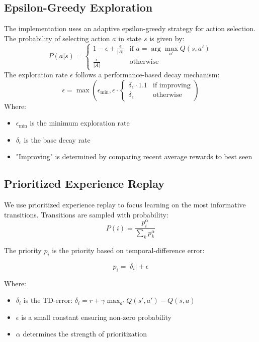 \documentclass[10pt]{article}
\theoremstyle{definition}
\begin{document}
\subsection{Epsilon-Greedy Exploration}
The implementation uses an adaptive epsilon-greedy strategy for action selection. \cite{tokic2011adaptive}
The probability of selecting action $a$ in state $s$ is given by:
\begin{equation}
    P(a|s) = \begin{cases}
    1-\epsilon + \frac{\epsilon}{|A|} & \text{if } a = \arg\max_{a'} Q(s,a') \\
    \frac{\epsilon}{|A|} & \text{otherwise}
    \end{cases}
\end{equation}
The exploration rate $\epsilon$ follows a performance-based decay mechanism:
\begin{equation}
    \epsilon = \max(\epsilon_{\min}, \epsilon \cdot \begin{cases}
    \delta_\epsilon \cdot 1.1 & \text{if improving} \\
    \delta_\epsilon & \text{otherwise}
    \end{cases})
\end{equation}
Where:
\begin{itemize}
    \item $\epsilon_{\min}$ is the minimum exploration rate
    \item $\delta_\epsilon$ is the base decay rate
    \item "Improving" is determined by comparing recent average rewards to best seen
\end{itemize}

\subsection{Prioritized Experience Replay}
We use prioritized experience replay to focus learning on the most informative transitions.\cite{schaul2016prioritized}
Transitions are sampled with probability:
\begin{equation}
    P(i) = \frac{p_i^\alpha}{\sum_k p_k^\alpha}
\end{equation}

The priority $p_i$ is the priority based on temporal-difference error:

\begin{equation}
    p_i = |\delta_i| + \epsilon
\end{equation}

Where:
\begin{itemize}
    \item $\delta_i$ is the TD-error: $\delta_i = r + \gamma \max_{a'} Q(s',a') - Q(s,a)$
    \item $\epsilon$ is a small constant ensuring non-zero probability
    \item $\alpha$ determines the strength of prioritization
\end{itemize}
\end{document}
